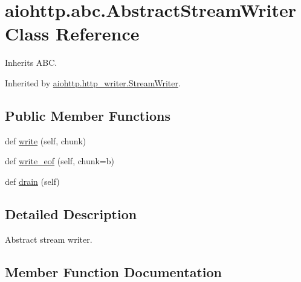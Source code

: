 \hypertarget{classaiohttp_1_1abc_1_1_abstract_stream_writer}{}\section{aiohttp.\+abc.\+Abstract\+Stream\+Writer Class Reference}
\label{classaiohttp_1_1abc_1_1_abstract_stream_writer}


Inherits A\+BC.



Inherited by \hyperlink{classaiohttp_1_1http__writer_1_1_stream_writer}{aiohttp.\+http\+\_\+writer.\+Stream\+Writer}.

\subsection*{Public Member Functions}
\begin{DoxyCompactItemize}
\item 
def \hyperlink{classaiohttp_1_1abc_1_1_abstract_stream_writer_a0ba5212f240284f71d8beedf19eb899b}{write} (self, chunk)
\item 
def \hyperlink{classaiohttp_1_1abc_1_1_abstract_stream_writer_a79e207de683e88eabaf5e4a0dd357fcb}{write\+\_\+eof} (self, chunk=b\textquotesingle{}\textquotesingle{})
\item 
def \hyperlink{classaiohttp_1_1abc_1_1_abstract_stream_writer_a0d822bd6f81d5127d6341afa89172fb4}{drain} (self)
\end{DoxyCompactItemize}


\subsection{Detailed Description}
\begin{DoxyVerb}Abstract stream writer.\end{DoxyVerb}
 

\subsection{Member Function Documentation}
\mbox{\label{classaiohttp_1_1abc_1_1_abstract_stream_writer_a0d822bd6f81d5127d6341afa89172fb4}} 
